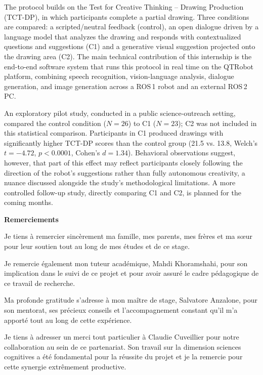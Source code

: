 \documentclass[11pt]{article}
\begin{document}
The protocol builds on the Test for Creative Thinking -- Drawing Production (TCT-DP), in which participants complete a partial drawing.
Three conditions are compared: a scripted/neutral feedback (control), an open dialogue driven by a language model that analyzes the drawing and responds with contextualized questions and suggestions (C1) and a generative visual suggestion projected onto the drawing area (C2).
The main technical contribution of this internship is the end-to-end software system that runs this protocol in real time on the QTRobot platform, combining speech recognition, vision-language analysis, dialogue generation, and image generation across a ROS\,1 robot and an external ROS\,2 PC.

An exploratory pilot study, conducted in a public science-outreach setting, compared the control condition ($N=26$) to C1 ($N=23$); C2 was not included in this statistical comparison.
Participants in C1 produced drawings with significantly higher TCT-DP scores than the control group (21.5 vs. 13.8, Welch's $t=-4.72$, $p<0.0001$, Cohen's $d=1.34$).
Behavioral observations suggest, however, that part of this effect may reflect participants closely following the direction of the robot's suggestions rather than fully autonomous creativity, a nuance discussed alongside the study's methodological limitations.
A more controlled follow-up study, directly comparing C1 and C2, is planned for the coming months.

\newpage

\begin{center}
    \Huge \textbf{Remerciements}
\end{center}
\vspace{0.5cm}
Je tiens à remercier sincèrement ma famille, mes parents, mes frères et ma sœur pour leur soutien tout au long de mes études et de ce stage.

Je remercie également mon tuteur académique, Mahdi Khoramshahi, pour son implication dans le suivi de ce projet et pour avoir assuré le cadre pédagogique de ce travail de recherche.

Ma profonde gratitude s'adresse à mon maître de stage, Salvatore Anzalone, pour son mentorat, ses précieux conseils et l'accompagnement constant qu'il m'a apporté tout au long de cette expérience.

Je tiens à adresser un merci tout particulier à Claudie Cuveillier pour notre collaboration au sein de ce partenariat. Son travail sur la dimension sciences cognitives a été fondamental pour la réussite du projet et je la remercie pour cette synergie extrêmement productive.
\end{document}
